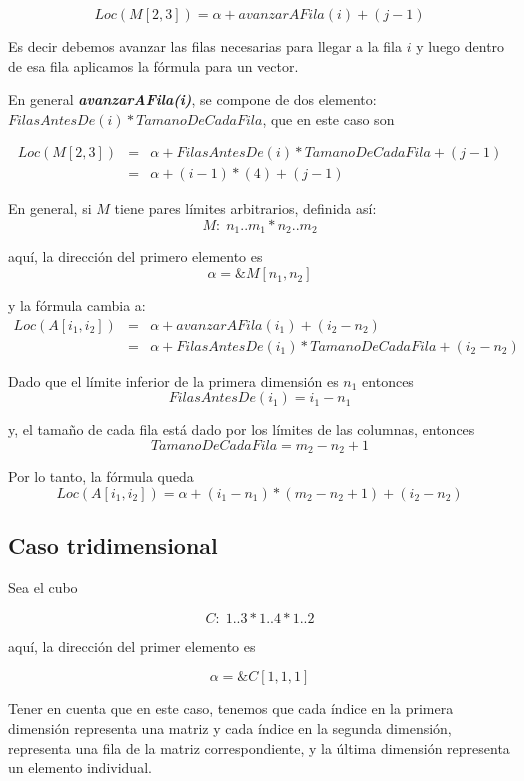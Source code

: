 $$ Loc \left( M[2,3] \right) = \alpha + avanzarAFila(i) +  (j - 1) $$

Es decir debemos avanzar las filas necesarias para llegar a la fila $i$
y luego dentro de esa fila aplicamos la fórmula para un vector.

En general \textbf{\em avanzarAFila(i)}, se compone de dos elemento:
$FilasAntesDe(i) * TamanoDeCadaFila$, que en este caso son

\begin{eqnarray*}
  Loc \left( M[2,3] \right) &=& \alpha + FilasAntesDe(i)*TamanoDeCadaFila +  (j - 1)\\
  &=& \alpha + (i-1)*(4) +  (j - 1) 
\end{eqnarray*}

En general, si $M$ tiene pares límites arbitrarios, definida así:
$$M:\; n_1..m_1*n_2..m_2$$

aquí, la dirección del primero elemento es
$$\alpha = \&M[n_1,n_2]$$

y la fórmula cambia a:
\begin{eqnarray*}
Loc \left( A[i_1,i_2] \right) &=& \alpha + avanzarAFila(i_1) +  (i_2 - n_2)\\
&=&\alpha + FilasAntesDe(i_1)*TamanoDeCadaFila +  (i_2 - n_2)
\end{eqnarray*}

Dado que el límite inferior de la primera dimensión es $n_1$ entonces
$$FilasAntesDe(i_1) = i_1 - n_1$$

y, el tamaño de cada fila está dado por los límites de las columnas,
entonces
$$TamanoDeCadaFila = m_2 - n_2  + 1$$

Por lo tanto, la fórmula queda
$$Loc \left( A[i_1,i_2] \right) = \alpha + (i_1 - n_1)*(m_2 - n_2  + 1)  +  (i_2 - n_2)$$

\subsection{Caso tridimensional}
\label{sec:caso-tridimensional}
Sea el cubo

$$ C:\; 1..3 * 1..4 * 1..2 $$

aquí, la dirección del primer elemento es

$$ \alpha = \&C[1,1,1]$$

Tener en cuenta que en este caso, tenemos que cada índice en la
primera dimensión representa una matriz y cada índice en la segunda
dimensión, representa una fila de la matriz correspondiente, y la
última dimensión representa un elemento individual.

